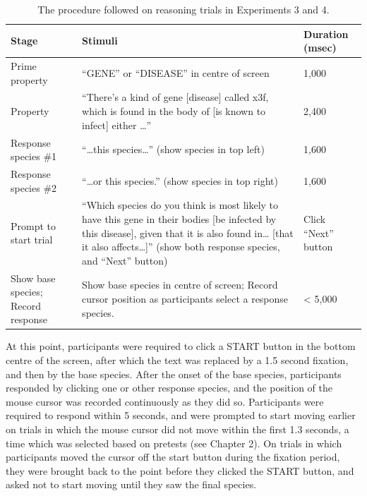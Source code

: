 \begin{table}[ht]
  \centering
  \caption{
    The procedure followed on reasoning trials
    in Experiments 3 and 4.
    \label{tab:exp3_procedure}
  }
  \begin{tabular}{p{} p{} p{}}
    \toprule
    Stage & Stimuli & Duration (msec) \\
    \midrule
    Prime property &
    ``GENE'' or ``DISEASE'' in centre of screen &
    1,000\\[1cm]
    
    Property &
    ``There's a kind of gene [disease] called x3f, which is found in the body of [is known to infect] either \ldots{}'' &
    2,400\\[1cm]
    
    Response species \#1 &
    ``\ldots{}this species\ldots{}'' (show species in top left) &
    1,600\\[1cm]
    
    Response species \#2 &
    ``\ldots{}or this species.'' (show species in top right) &
    1,600\\[1cm]
    
    Prompt to start trial &
    ``Which species do you think is most likely to have this gene in their bodies [be infected by this disease], given that it is also found in\ldots{} [that it also affects\ldots{}]'' (show both response species, and ``Next'' button) &
    Click ``Next'' button\\[1cm]
    
    Show base species; Record response &
    Show base species in centre of screen; Record cursor position as participants select a response species. &
    < 5,000 \\
    \bottomrule
  \end{tabular}
\end{table}


At this point, participants were required to click a START button
in the bottom centre of the screen,
after which the text was replaced by a 1.5 second fixation,
and then by the base species.
After the onset of the base species,
participants responded by clicking one or other response species,
and the position of the mouse cursor was recorded continuously as they did so.
Participants were required to respond within 5 seconds,
and were prompted to start moving earlier
on trials in which the mouse cursor did not move
within the first 1.3 seconds,
a time which was selected based on pretests (see Chapter 2).
On trials in which participants moved
the cursor off the start button during the fixation period,
they were brought back to the point
before they clicked the START button,
and asked not to start moving
until they saw the final species.

